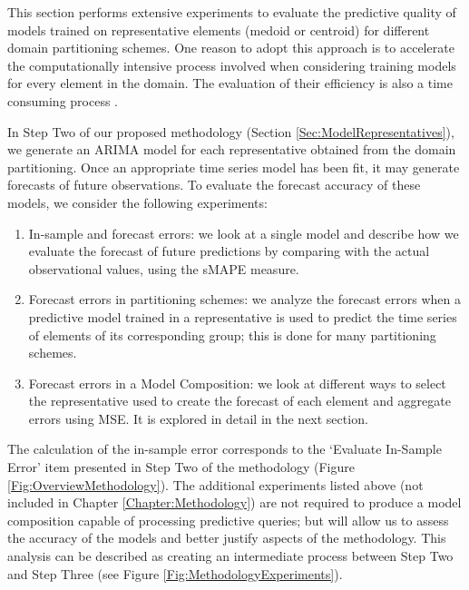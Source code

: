 This section performs extensive experiments to evaluate the predictive quality of models trained on representative elements (medoid or centroid) for different domain partitioning schemes. One reason to adopt this approach is to accelerate the computationally intensive process involved when considering training models for every element in the domain. The evaluation of their efficiency is also a time consuming process \cite{Hyndman2018}.

In Step Two of our proposed methodology (Section \ref{Sec:ModelRepresentatives}), we generate an ARIMA model for each representative obtained from the domain partitioning. Once an appropriate time series model has been fit, it may generate forecasts of future observations. To evaluate the forecast accuracy of these models, we consider the following experiments:

\begin{enumerate}
    \item In-sample and forecast errors: we look at a single model and describe how we evaluate the forecast of future predictions by comparing with the actual observational values, using the sMAPE measure.
    \item Forecast errors in partitioning schemes: we analyze the forecast errors when a predictive model trained in a representative is used to predict the time series of elements of its corresponding group; this is done for many partitioning schemes.
    \item Forecast errors in a Model Composition: we look at different ways to select the representative used to create the forecast of each element and aggregate errors using MSE. It is explored in detail in the next section.
\end{enumerate}

The calculation of the in-sample error corresponds to the `Evaluate In-Sample Error' item presented in Step Two of the methodology (Figure \ref{Fig:OverviewMethodology}). The additional experiments listed above (not included in Chapter \ref{Chapter:Methodology}) are not required to produce a model composition capable of processing predictive queries; but will allow us to assess the accuracy of the models and better justify aspects of the methodology. This analysis can be described as creating an intermediate process between Step Two and Step Three (see Figure \ref{Fig:MethodologyExperiments}). 

